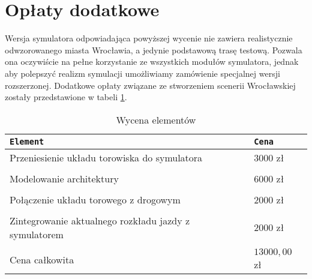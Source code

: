 \documentclass[12pt,a4paper]{article}
\begin{document}
\section{Opłaty dodatkowe}
Wersja symulatora odpowiadająca powyższej wycenie nie zawiera realistycznie odwzorowanego miasta
Wrocławia, a jedynie podstawową trasę testową. Pozwala ona oczywiście na pełne korzystanie ze
wszystkich modułów symulatora, jednak aby polepszyć realizm symulacji umożliwiamy zamówienie
specjalnej wersji rozszerzonej. Dodatkowe opłaty związane ze stworzeniem scenerii Wrocławskiej
zostały przedstawione w tabeli \ref{grafa}.

\begin{table}[h]
 \caption{Wycena elementów}
 \begin{center}
	\begin{tabular}{l|l}
	\texttt{Element} & \texttt{Cena}  \\\hline
	Przeniesienie układu torowiska do symulatora & $3000$ zł \\\\
	Modelowanie architektury & $6000$ zł \\\\
	Połączenie układu torowego z drogowym & $2000$ zł \\\\
	Zintegrowanie aktualnego rozkładu jazdy z symulatorem & $2000$ zł \\
 \hline\\
 Cena całkowita & $13 000,00$ zł
\end{tabular}
\end{center}
\label{grafa}
\end{table}
\end{document}
